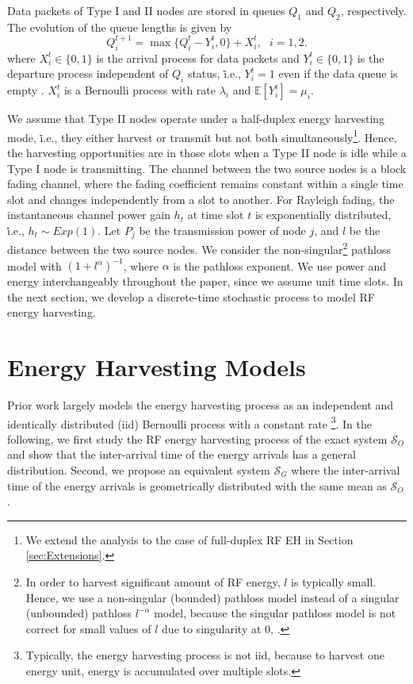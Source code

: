 \documentclass[draftcls,12pt,onecolumn]{IEEEtran}
\begin{document}
Data packets of Type I and II nodes are stored in queues $Q_1$ and $Q_2$, respectively. The evolution of the queue lengths is given by \cite{szpankowski} 
\begin{equation}\label{eqn: q evl}
Q_i^{t+1}=\max\lbrace Q_i^{t}-Y_i^{t},0\rbrace+ X_i^{t}, \ \ \ i=1,2.
\end{equation}
where $X_i^{t} \in \lbrace 0,1 \rbrace$ is the arrival process for data packets and $Y_i^{t} \in \lbrace 0,1 \rbrace$ is the departure process independent of $Q_i$ status, \.i.e., $Y_i^{t}=1$ even if the data queue is empty \cite{naware2005stability}. $X_i^{t}$ is a Bernoulli process with rate $\lambda_i$ and $\mathbb{E}[ Y_i^{t}]=\mu_i$. 

We assume that Type II nodes operate under a half-duplex energy harvesting mode, \.i.e., they either harvest or transmit but not both simultaneously\footnote{We extend the analysis to the case of full-duplex RF EH in Section \ref{sec:Extensions}.}. Hence, the harvesting opportunities are in those slots when a Type II node is idle while a Type I node is transmitting. The channel between the two source nodes is a block fading channel, where the fading coefficient remains constant within a single time slot and changes independently from a slot to another. For Rayleigh fading, the instantaneous channel power gain $h_t$ at time slot $t$ is exponentially distributed, \.i.e., $h_t \sim \textit{Exp}(1)$. Let $P_j$ be the transmission power of node $j$, and $l$ be the distance between the two source nodes. We consider the non-singular\footnote{In order to harvest significant amount of RF energy, $l$ is typically small. Hence, we use a non-singular (bounded) pathloss model instead of a singular (unbounded) pathloss $l^{-\alpha}$ model, because the singular pathloss model is not correct for small values of $l$ due to singularity at $0$, \cite{2009unbounded}. } pathloss model with $(1+l^\alpha)^{-1}$, where $\alpha$ is the pathloss exponent. We use power and energy interchangeably throughout the paper, since we assume unit time slots. In the next section, we develop a discrete-time stochastic process to model RF energy harvesting. 


\section{Energy Harvesting Models} \label{sec:Energy_Harvesting_Model}

Prior work largely models the energy harvesting process as an independent and identically distributed (iid) Bernoulli process with a constant rate \cite{jeon2015stability}\footnote{Typically, the energy harvesting process is not iid, because to harvest one energy unit, energy is accumulated over multiple slots.}. In the following, we first study the RF energy harvesting process of the exact system $\mathcal{S}_O$ and show that the inter-arrival time of the energy arrivals has a general distribution. Second, we propose an equivalent system $\mathcal{S}_G$ where the inter-arrival time of the energy arrivals is geometrically distributed with the same mean as $\mathcal{S}_O$. 
\end{document}
